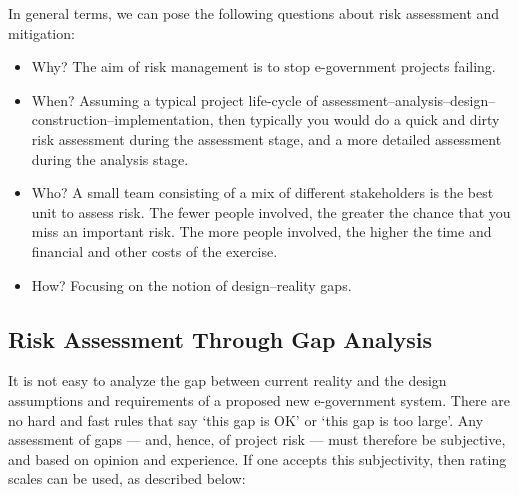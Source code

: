 In general terms, we can pose the following questions about risk assessment and
mitigation:
\begin{itemize}
	\item Why? The aim of risk management is to
	stop e-government projects failing.
	\item When? Assuming a typical project life-cycle of assessment–analysis–design–construction–implementation, then
	typically you would do a quick and dirty
	risk assessment during the assessment
	stage, and a more detailed assessment
	during the analysis stage.
	\item Who? A small team consisting of a mix of
	different stakeholders is the best unit to
	assess risk. The fewer people involved, the
	greater the chance that you miss an
	important risk. The more people involved,
	the higher the time and financial and
	other costs of the exercise.
	\item How? Focusing	on the notion of design–reality gaps.
\end{itemize}

\subsection[Risk Assessment]{Risk Assessment Through Gap Analysis}
It is not easy to analyze the gap between current reality and the design assumptions and requirements of a proposed new e-government
system. There are no hard and fast rules that
say `this gap is OK' or ‘this gap is too large’.
Any assessment of gaps — and, hence, of
project risk — must therefore be subjective,
and based on opinion and experience. If one
accepts this subjectivity, then rating scales
can be used, as described below:


